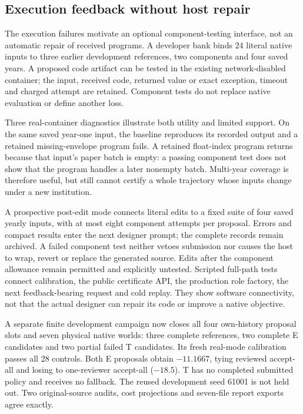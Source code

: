 \FloatBarrier
\subsection{Execution feedback without host repair}
The execution failures motivate an optional component-testing interface, not
an automatic repair of received programs. A developer bank binds 24 literal
native inputs to three earlier development references, two components and
four saved years. A proposed code artifact can be tested in the existing
network-disabled container; the input, received code, returned value or exact
exception, timeout and charged attempt are retained. Component tests do not
replace native evaluation or define another loss.

Three real-container diagnostics illustrate both utility and limited support.
On the same saved year-one input, the baseline reproduces its recorded output
and a retained missing-envelope program fails. A retained float-index program
returns because that input's paper batch is empty: a passing component test
does not show that the program handles a later nonempty batch. Multi-year
coverage is therefore useful, but still cannot certify a whole trajectory
whose inputs change under a new institution.

A prospective post-edit mode connects literal edits to a fixed suite of four
saved yearly inputs, with at most eight component attempts per proposal.
Errors and compact results enter the next designer prompt; the complete
records remain archived. A failed component test neither vetoes submission
nor causes the host to wrap, revert or replace the generated source. Edits
after the component allowance remain permitted and explicitly untested.
Scripted full-path tests connect calibration, the public certificate API,
the production role factory, the next feedback-bearing request and cold
replay. They show software connectivity, not that the actual designer can
repair its code or improve a native objective.

A separate finite development campaign now closes all four own-history
proposal slots and seven physical native worlds: three complete references,
two complete E candidates and two partial failed T candidates. Its fresh
real-mode calibration passes all 28 controls. Both E proposals obtain
$-11.1667$, tying reviewed accept-all and losing to one-reviewer accept-all
($-18.5$). T has no completed submitted policy and receives no fallback.
The reused development seed 61001 is not held out. Two original-source audits,
cost projections and seven-file report exports agree exactly.

